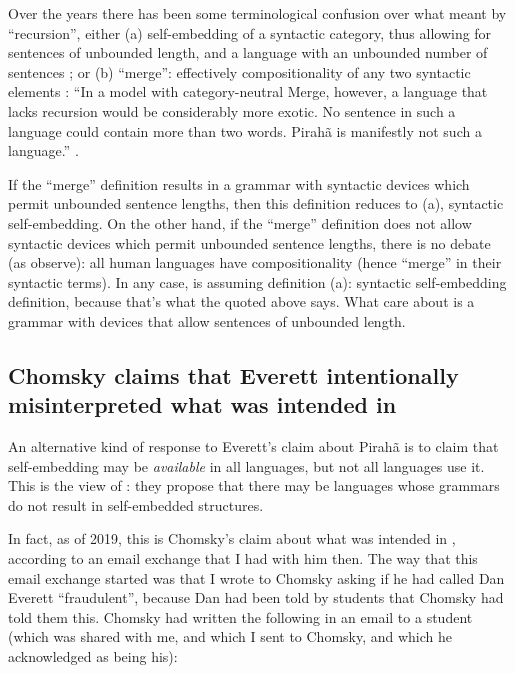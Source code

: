 \documentclass{article}
\begin{document}
Over the years there has been some terminological confusion over what \citet{hauser2002faculty} meant by ``recursion'', either (a) self-embedding of a syntactic category, thus allowing for sentences of unbounded length, and a language with an unbounded number of sentences \citep{everett2005cultural}; or (b) ``merge'': effectively compositionality of any two syntactic elements \citep{nevins2009evidence}: ``In a model with category-neutral Merge, however, a language that lacks recursion would be considerably more exotic. No sentence in such a language could contain more than two words. Pirahã is manifestly not such a language.'' \citep[366]{nevins2009evidence}.

If the ``merge'' definition results in a grammar with syntactic devices which permit unbounded sentence lengths, then this definition reduces to (a), syntactic self-embedding. On the other hand, if the ``merge'' definition does not allow syntactic devices which permit unbounded sentence lengths, there is no debate (as \citet{nevins2009evidence} observe): all human languages have compositionality (hence ``merge'' in their syntactic terms). In any case, \citet{everett2005cultural} is assuming definition (a): syntactic self-embedding definition, because that’s what the \citet{hauser2002faculty} quoted above says. What \citet{hauser2002faculty} care about is a grammar with devices that allow sentences of unbounded length.

\subsection{Chomsky claims that Everett intentionally misinterpreted what was intended in \citet{hauser2002faculty}}

An alternative kind of response to Everett’s claim about Pirahã is to claim that self-embedding may be \textit{available} in all languages, but not all languages use it. This is the view of \citet{jackendoff2014what}: they propose that there may be languages whose grammars do not result in self-embedded structures.

In fact, as of 2019, this is Chomsky’s claim about what was intended in \citet{hauser2002faculty}, according to an email exchange that I had with him then. The way that this email exchange started was that I wrote to Chomsky asking if he had called Dan Everett ``fraudulent'', because Dan had been told by students that Chomsky had told them this. Chomsky had written the following in an email to a student (which was shared with me, and which I sent to Chomsky, and which he acknowledged as being his):
\end{document}
